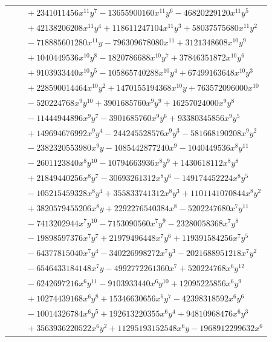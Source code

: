 \documentclass[11pt]{article}
\begin{document}
\begin{longtable}{@{}ll@{}}
 & $\quad +2341011456x^{11}y^{7}-13655900160x^{11}y^{6}-46820229120x^{11}y^{5}$\\
 & $\quad +42138206208x^{11}y^{4}+118611247104x^{11}y^{3}+58037575680x^{11}y^{2}$\\
 & $\quad -718885601280x^{11}y-796309678080x^{11}+3121348608x^{10}y^{9}$\\
 & $\quad +1040449536x^{10}y^{8}-1820786688x^{10}y^{7}+37846351872x^{10}y^{6}$\\
 & $\quad +9103933440x^{10}y^{5}-105865740288x^{10}y^{4}+67499163648x^{10}y^{3}$\\
 & $\quad +228590014464x^{10}y^{2}+1470155194368x^{10}y+763572096000x^{10}$\\
 & $\quad -520224768x^{9}y^{10}+3901685760x^{9}y^{9}+16257024000x^{9}y^{8}$\\
 & $\quad -11444944896x^{9}y^{7}-3901685760x^{9}y^{6}+93380345856x^{9}y^{5}$\\
 & $\quad +149694676992x^{9}y^{4}-244245528576x^{9}y^{3}-581668190208x^{9}y^{2}$\\
 & $\quad -2382320553980x^{9}y-1085442877240x^{9}-1040449536x^{8}y^{11}$\\
 & $\quad -2601123840x^{8}y^{10}-10794663936x^{8}y^{9}+1430618112x^{8}y^{8}$\\
 & $\quad +21849440256x^{8}y^{7}-30693261312x^{8}y^{6}-149174452224x^{8}y^{5}$\\
 & $\quad -105215459328x^{8}y^{4}+355833741312x^{8}y^{3}+1101141070844x^{8}y^{2}$\\
 & $\quad +3820579455206x^{8}y+2292276540384x^{8}-5202247680x^{7}y^{11}$\\
 & $\quad -7413202944x^{7}y^{10}-7153090560x^{7}y^{9}-23280058368x^{7}y^{8}$\\
 & $\quad -19898597376x^{7}y^{7}+21979496448x^{7}y^{6}+119391584256x^{7}y^{5}$\\
 & $\quad -64377815040x^{7}y^{4}-340226998272x^{7}y^{3}-2021688951218x^{7}y^{2}$\\
 & $\quad -6546433184148x^{7}y-4992772261360x^{7}+520224768x^{6}y^{12}$\\
 & $\quad -6242697216x^{6}y^{11}-9103933440x^{6}y^{10}+12095225856x^{6}y^{9}$\\
 & $\quad +10274439168x^{6}y^{8}+15346630656x^{6}y^{7}-42398318592x^{6}y^{6}$\\
 & $\quad -10014326784x^{6}y^{5}+192613220355x^{6}y^{4}+94810968476x^{6}y^{3}$\\
 & $\quad +3563936220522x^{6}y^{2}+11295193152548x^{6}y-1968912299632x^{6}$\\

\end{longtable}
\end{document}
